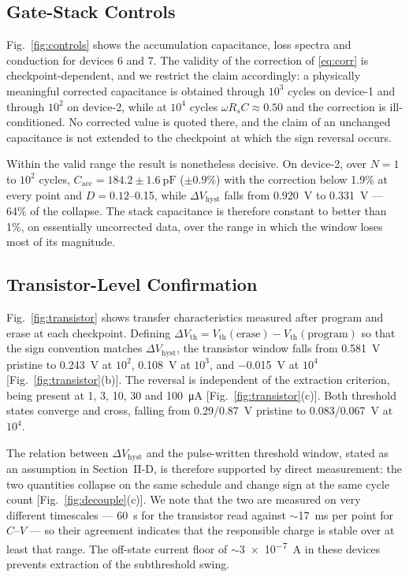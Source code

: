 \documentclass[journal]{IEEEtran}
\newcommand{\rev}[1]{#1}                    %
\newcommand{\Vth}{V_{\mathrm{th}}}
\newcommand{\dVh}{\Delta V_{\mathrm{hyst}}}
\newcommand{\Cacc}{C_{\mathrm{acc}}}
\newcommand{\Rs}{R_s}
\begin{document}
\subsection{Gate-Stack Controls}
\rev{Fig.~\ref{fig:controls} shows the accumulation capacitance, loss
spectra and conduction for devices 6 and 7. The validity of the
correction of \eqref{eq:corr} is checkpoint-dependent, and we restrict
the claim accordingly: a physically meaningful corrected capacitance is
obtained through $10^3$ cycles on device-1 and through $10^2$ on
device-2, while at $10^4$ cycles $\omega\Rs C\approx0.50$ and the
correction is ill-conditioned. No corrected value is quoted there, and
the claim of an unchanged capacitance is not extended to the checkpoint
at which the sign reversal occurs.

Within the valid range the result is nonetheless decisive. On device-2,
over $N=1$ to $10^2$ cycles, $\Cacc=184.2\pm\SI{1.6}{\pico\farad}$
($\pm0.9$\%) with the correction below 1.9\% at every point and
$D=0.12$--0.15, while $\dVh$ falls from \SI{0.920}{\volt} to
\SI{0.331}{\volt} --- 64\% of the collapse. The stack capacitance is
therefore constant to better than 1\%, on essentially uncorrected data,
over the range in which the window loses most of its magnitude.}

\subsection{Transistor-Level Confirmation}
\rev{Fig.~\ref{fig:transistor} shows transfer characteristics measured
after program and erase at each checkpoint. Defining
$\Delta\Vth=\Vth(\text{erase})-\Vth(\text{program})$ so that the sign
convention matches $\dVh$, the transistor window falls from
\SI{+0.581}{\volt} pristine to \SI{+0.243}{\volt} at $10^2$,
\SI{+0.108}{\volt} at $10^3$, and \SI{-0.015}{\volt} at $10^4$
[Fig.~\ref{fig:transistor}(b)]. The reversal is independent of the
extraction criterion, being present at 1, 3, 10, 30 and
\SI{100}{\micro\ampere} [Fig.~\ref{fig:transistor}(c)]. Both threshold
states converge and cross, falling from 0.29/\SI{0.87}{\volt} pristine
to 0.083/\SI{0.067}{\volt} at $10^4$.

The relation between $\dVh$ and the pulse-written threshold window,
stated as an assumption in Section~II-D, is therefore supported by
direct measurement: the two quantities collapse on the same schedule and
change sign at the same cycle count [Fig.~\ref{fig:decouple}(c)]. We
note that the two are measured on very different timescales ---
\SI{60}{\second} for the transistor read against
$\sim$\SI{17}{\milli\second} per point for $C$--$V$ --- so their
agreement indicates that the responsible charge is stable over at least
that range. The off-state current floor of
$\sim$\SI{3e-7}{\ampere} in these devices prevents extraction of the
subthreshold swing.}
\end{document}
